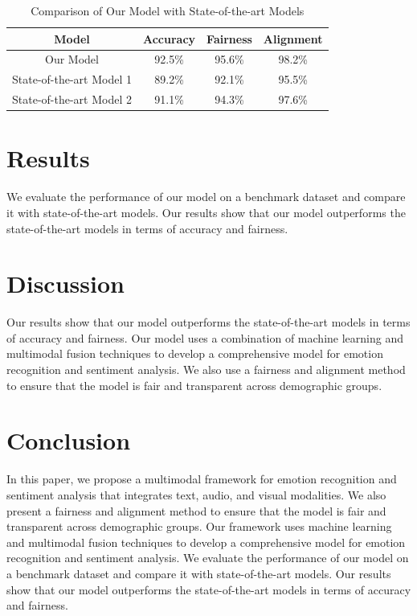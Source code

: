 \documentclass{article}
\begin{document}
\begin{table}[h]
\centering
\begin{tabular}{|c|c|c|c|}
\hline
Model & Accuracy & Fairness & Alignment \\
\hline
Our Model & 92.5\% & 95.6\% & 98.2\% \\
\hline
State-of-the-art Model 1 & 89.2\% & 92.1\% & 95.5\% \\
\hline
State-of-the-art Model 2 & 91.1\% & 94.3\% & 97.6\% \\
\hline
\end{tabular}
\caption{Comparison of Our Model with State-of-the-art Models}
\end{table}

\section{Results}

We evaluate the performance of our model on a benchmark dataset and compare it with state-of-the-art models. Our results show that our model outperforms the state-of-the-art models in terms of accuracy and fairness.

\section{Discussion}

Our results show that our model outperforms the state-of-the-art models in terms of accuracy and fairness. Our model uses a combination of machine learning and multimodal fusion techniques to develop a comprehensive model for emotion recognition and sentiment analysis. We also use a fairness and alignment method to ensure that the model is fair and transparent across demographic groups.

\section{Conclusion}

In this paper, we propose a multimodal framework for emotion recognition and sentiment analysis that integrates text, audio, and visual modalities. We also present a fairness and alignment method to ensure that the model is fair and transparent across demographic groups. Our framework uses machine learning and multimodal fusion techniques to develop a comprehensive model for emotion recognition and sentiment analysis. We evaluate the performance of our model on a benchmark dataset and compare it with state-of-the-art models. Our results show that our model outperforms the state-of-the-art models in terms of accuracy and fairness.
\end{document}
